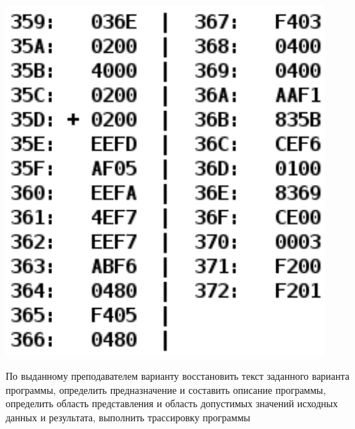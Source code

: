 \begin{minipage}{0.3\textwidth}
  \includegraphics[width=0.9\textwidth]{imgs/task.png}
\end{minipage}
\begin{minipage}{0.5\textwidth}
По выданному преподавателем варианту восстановить текст заданного варианта программы, определить предназначение и составить описание программы, определить область представления и область допустимых значений исходных данных и результата, выполнить трассировку программы
\end{minipage}